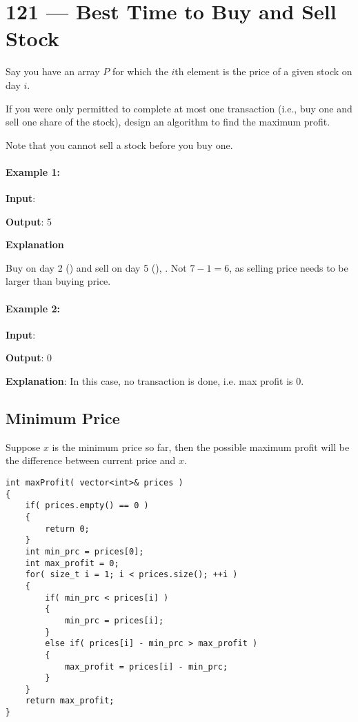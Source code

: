 \section{121 --- Best Time to Buy and Sell Stock}
Say you have an array $P$ for which the $i$th element is the price of a given stock on day $i$.

If you were only permitted to complete at most one transaction (i.e., buy one and sell one share of the stock), design an algorithm to find the maximum profit.

Note that you cannot sell a stock before you buy one.
\paragraph{Example 1:}
\begin{flushleft}
\textbf{Input}: \fcj{[7,1,5,3,6,4]}

\textbf{Output}: 5

\textbf{Explanation}

Buy on day 2 () and sell on day 5 (), . Not $7-1 = 6$, as selling price needs to be larger than buying price.
\end{flushleft}

\paragraph{Example 2:}
\begin{flushleft}
\textbf{Input}: \fcj{[7,6,4,3,1]}

\textbf{Output}: 0

\textbf{Explanation}: In this case, no transaction is done, i.e. max profit is 0.
\end{flushleft}
\subsection{Minimum Price}

Suppose $x$ is the minimum price so far, then the possible maximum profit will be the difference between current price and $x$.

\setcounter{lstlisting}{0}
\begin{lstlisting}[style=customc, caption={One Pass}]
int maxProfit( vector<int>& prices )
{
    if( prices.empty() == 0 )
    {
        return 0;
    }
    int min_prc = prices[0];
    int max_profit = 0;
    for( size_t i = 1; i < prices.size(); ++i )
    {
        if( min_prc < prices[i] )
        {
            min_prc = prices[i];
        }
        else if( prices[i] - min_prc > max_profit )
        {
            max_profit = prices[i] - min_prc;
        }
    }
    return max_profit;
}
\end{lstlisting}

